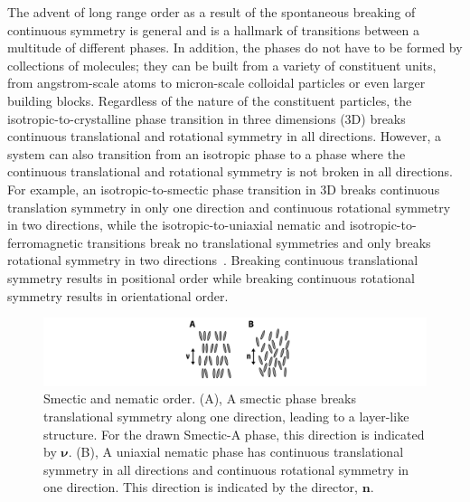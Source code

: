The advent of long range order as a result of the spontaneous breaking of continuous symmetry is general and is a hallmark of transitions between a multitude of different phases.
In addition, the phases do not have to be formed by collections of molecules; they can be built from a variety of constituent units, from angstrom-scale atoms to micron-scale colloidal particles or even larger building blocks.
Regardless of the nature of the constituent particles, the isotropic-to-crystalline phase transition in three dimensions (3D) breaks continuous translational and rotational symmetry in all directions.
However, a system can also transition from an isotropic phase to a phase where the continuous translational and rotational symmetry is not broken in all directions.
For example, an isotropic-to-smectic phase transition in 3D breaks continuous translation symmetry in only one direction and continuous rotational symmetry in two directions, while the isotropic-to-uniaxial nematic and isotropic-to-ferromagnetic transitions break no translational symmetries and only breaks rotational symmetry in two directions~\cite{RN175}.
Breaking continuous translational symmetry results in positional order while breaking continuous rotational symmetry results in orientational order.
\begin{figure}
  \includegraphics{figures/C1/Ch1-Figs_SmecticNematic.png}
  \caption{Smectic and nematic order.
  (A), A smectic phase breaks translational symmetry along one direction, leading to a layer-like structure.
  For the drawn Smectic-A phase, this direction is indicated by $\bm{\nu}$.
  (B), A uniaxial nematic phase has continuous translational symmetry in all directions and continuous rotational symmetry in one direction. This direction is indicated by the director, $\mathbf{n}$.}\label{f:1-SmecticNematic}
\end{figure}

